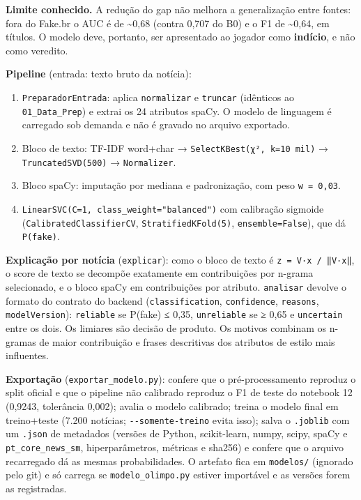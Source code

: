 \documentclass[
  brazilian,
  11pt,
]{article}
\providecommand{\tightlist}{%
  \setlength{\itemsep}{0pt}\setlength{\parskip}{0pt}}
\begin{document}
\textbf{Limite conhecido.} A redução do gap não melhora a generalização entre fontes: fora do Fake.br o AUC é de \textasciitilde0,68 (contra 0,707 do B0) e o F1 de \textasciitilde0,64, em títulos. O modelo deve, portanto, ser apresentado ao jogador como \textbf{indício}, e não como veredito.

\textbf{Pipeline} (entrada: texto bruto da notícia):

\begin{enumerate}
\def\labelenumi{\arabic{enumi}.}
\tightlist
\item
  \texttt{PreparadorEntrada}: aplica \texttt{normalizar} e \texttt{truncar} (idênticos ao \texttt{01\_Data\_Prep}) e extrai os 24 atributos spaCy. O modelo de linguagem é carregado sob demanda e não é gravado no arquivo exportado.
\item
  Bloco de texto: TF-IDF word+char → \texttt{SelectKBest(χ²,\ k=10\ mil)} → \texttt{TruncatedSVD(500)} → \texttt{Normalizer}.
\item
  Bloco spaCy: imputação por mediana e padronização, com peso \texttt{w\ =\ 0,03}.
\item
  \texttt{LinearSVC(C=1,\ class\_weight="balanced")} com calibração sigmoide (\texttt{CalibratedClassifierCV}, \texttt{StratifiedKFold(5)}, \texttt{ensemble=False}), que dá \texttt{P(fake)}.
\end{enumerate}

\textbf{Explicação por notícia} (\texttt{explicar}): como o bloco de texto é \texttt{z\ =\ V·x\ /\ ‖V·x‖}, o score de texto se decompõe exatamente em contribuições por n-grama selecionado, e o bloco spaCy em contribuições por atributo. \texttt{analisar} devolve o formato do contrato do backend (\texttt{classification}, \texttt{confidence}, \texttt{reasons}, \texttt{modelVersion}): \texttt{reliable} se P(fake) ≤ 0,35, \texttt{unreliable} se ≥ 0,65 e \texttt{uncertain} entre os dois. Os limiares são decisão de produto. Os motivos combinam os n-gramas de maior contribuição e frases descritivas dos atributos de estilo mais influentes.

\textbf{Exportação} (\texttt{exportar\_modelo.py}): confere que o pré-processamento reproduz o split oficial e que o pipeline não calibrado reproduz o F1 de teste do notebook 12 (0,9243, tolerância 0,002); avalia o modelo calibrado; treina o modelo final em treino+teste (7.200 notícias; \texttt{-\/-somente-treino} evita isso); salva o \texttt{.joblib} com um \texttt{.json} de metadados (versões de Python, scikit-learn, numpy, scipy, spaCy e \texttt{pt\_core\_news\_sm}, hiperparâmetros, métricas e sha256) e confere que o arquivo recarregado dá as mesmas probabilidades. O artefato fica em \texttt{modelos/} (ignorado pelo git) e só carrega se \texttt{modelo\_olimpo.py} estiver importável e as versões forem as registradas.
\end{document}
